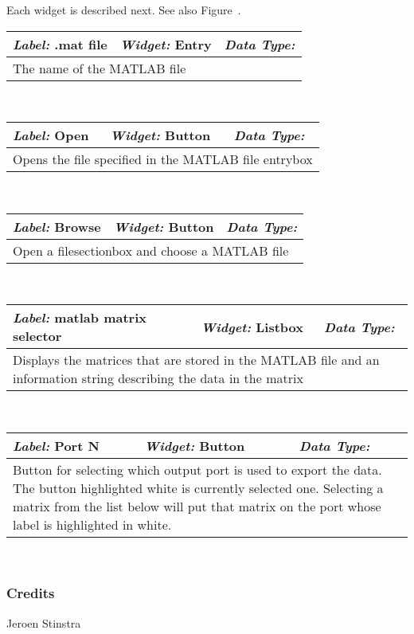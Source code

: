 Each  widget is described next.  See also Figure~.
\begin{centering}
\begin{tabular}{|p{4cm}|p{4cm}|p{4cm}|} \hline
{\emph{Label:}  .mat file }&{\emph{Widget:}  Entry }&{\emph{Data Type:} } \\ \hline
\multicolumn{3}{|p{12cm}|}{ The name of the MATLAB file } \\ \hline
\end{tabular} \\
\vspace{0.25cm}
\begin{tabular}{|p{4cm}|p{4cm}|p{4cm}|} \hline
{\emph{Label:}  Open }&{\emph{Widget:}  Button }&{\emph{Data Type:} } \\ \hline
\multicolumn{3}{|p{12cm}|}{ Opens the file specified in the MATLAB file entrybox } \\ \hline
\end{tabular} \\
\vspace{0.25cm}
\begin{tabular}{|p{4cm}|p{4cm}|p{4cm}|} \hline
{\emph{Label:}  Browse }&{\emph{Widget:}  Button }&{\emph{Data Type:} } \\ \hline
\multicolumn{3}{|p{12cm}|}{ Open a filesectionbox and choose a MATLAB file } \\ \hline
\end{tabular} \\
\vspace{0.25cm}
\begin{tabular}{|p{4cm}|p{4cm}|p{4cm}|} \hline
{\emph{Label:}  matlab matrix selector }&{\emph{Widget:}  Listbox }&{\emph{Data Type:} } \\ \hline
\multicolumn{3}{|p{12cm}|}{ Displays the matrices that are stored in the MATLAB file and an information 
	              string describing the data in the matrix} \\ \hline
\end{tabular} \\
\vspace{0.25cm}
\begin{tabular}{|p{4cm}|p{4cm}|p{4cm}|} \hline
{\emph{Label:}  Port N }&{\emph{Widget:}  Button }&{\emph{Data Type:} } \\ \hline
\multicolumn{3}{|p{12cm}|}{ Button for selecting which output port is used to export the data. The button highlighted
	white is currently selected one. Selecting a matrix from the list below will put that matrix
	on the port whose label is highlighted in white. } \\ \hline
\end{tabular} \\
\vspace{0.25cm}
\end{centering}
\subsubsection*{Credits}
 Jeroen Stinstra 

